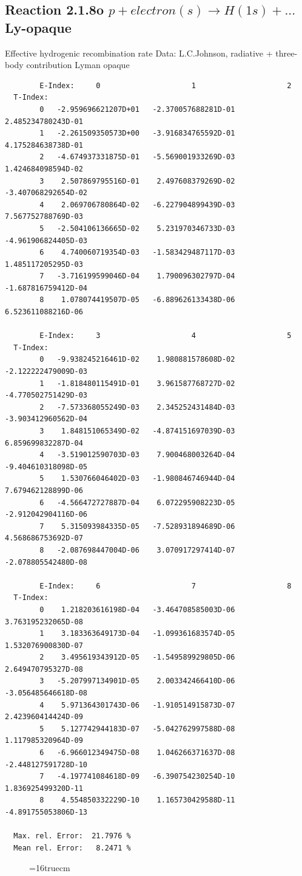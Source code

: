 \documentclass[12pt,dvips]{article}
\begin{document}
\subsection{
  Reaction 2.1.8o $ p + electron(s) \rightarrow H(1s) + ...$ Ly-opaque
}

   Effective hydrogenic recombination rate
   Data: L.C.Johnson, radiative + three-body contribution
   Lyman opaque


\begin{small}\begin{verbatim}
        E-Index:     0                     1                     2
  T-Index:
        0   -2.959696621207D+01   -2.370057688281D-01    2.485234780243D-01
        1   -2.261509350573D+00   -3.916834765592D-01    4.175284638738D-01
        2   -4.674937331875D-01   -5.569001933269D-03    1.424684098594D-02
        3    2.507869795516D-01    2.497608379269D-02   -3.407068292654D-02
        4    2.069706780864D-02   -6.227904899439D-03    7.567752788769D-03
        5   -2.504106136665D-02    5.231970346733D-03   -4.961906824405D-03
        6    4.740060719354D-03   -1.583429487117D-03    1.485117205295D-03
        7   -3.716199599046D-04    1.790096302797D-04   -1.687816759412D-04
        8    1.078074419507D-05   -6.889626133438D-06    6.523611088216D-06

        E-Index:     3                     4                     5
  T-Index:
        0   -9.938245216461D-02    1.980881578608D-02   -2.122222479009D-03
        1   -1.818480115491D-01    3.961587768727D-02   -4.770502751429D-03
        2   -7.573368055249D-03    2.345252431484D-03   -3.903412960562D-04
        3    1.848151065349D-02   -4.874151697039D-03    6.859699832287D-04
        4   -3.519012590703D-03    7.900468003264D-04   -9.404610318098D-05
        5    1.530766046402D-03   -1.980846746944D-04    7.679462128899D-06
        6   -4.566472727887D-04    6.072295908223D-05   -2.912042904116D-06
        7    5.315093984335D-05   -7.528931894689D-06    4.568686753692D-07
        8   -2.087698447004D-06    3.070917297414D-07   -2.078805542480D-08

        E-Index:     6                     7                     8
  T-Index:
        0    1.218203616198D-04   -3.464708585003D-06    3.763195232065D-08
        1    3.183363649173D-04   -1.099361683574D-05    1.532076900830D-07
        2    3.495619343912D-05   -1.549589929805D-06    2.649470795327D-08
        3   -5.207997134901D-05    2.003342466410D-06   -3.056485646618D-08
        4    5.971364301743D-06   -1.910514915873D-07    2.423960414424D-09
        5    5.127742944183D-07   -5.042762997588D-08    1.117985320964D-09
        6   -6.966012349475D-08    1.046266371637D-08   -2.448127591728D-10
        7   -4.197741084618D-09   -6.390754230254D-10    1.836925499320D-11
        8    4.554850332229D-10    1.165730429588D-11   -4.891755053806D-13

  Max. rel. Error:  21.7976 %
  Mean rel. Error:   8.2471 %

\end{verbatim}\end{small}
\begin{figure} \label{2.1.8o}
\epsfxsize=16truecm
\end{figure}
\newpage
\end{document}

